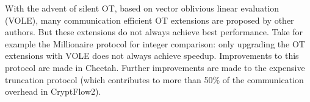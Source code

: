 \documentclass[../thesis.tex]{subfiles}
\begin{document}
With the advent of silent OT, based on vector oblivious linear evaluation (VOLE), many communication efficient OT extensions are proposed by other authors. But these extensions do not always achieve best performance. Take for example the Millionaire protocol for integer comparison: only upgrading the OT extensions with VOLE does not always achieve speedup. Improvements to this protocol are made in Cheetah. Further improvements are made to the expensive truncation protocol (which contributes to more than 50\% of the communication overhead in CryptFlow2).  







\end{document}
